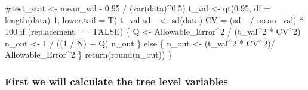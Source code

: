 \documentclass[
  letterpaper,
]{book}
\newenvironment{Shaded}{\begin{snugshade}}{\end{snugshade}}
\newcommand{\AttributeTok}[1]{\textcolor[rgb]{0.40,0.45,0.13}{#1}}
\newcommand{\CommentTok}[1]{\textcolor[rgb]{0.37,0.37,0.37}{#1}}
\newcommand{\ConstantTok}[1]{\textcolor[rgb]{0.56,0.35,0.01}{#1}}
\newcommand{\ControlFlowTok}[1]{\textcolor[rgb]{0.00,0.23,0.31}{#1}}
\newcommand{\DecValTok}[1]{\textcolor[rgb]{0.68,0.00,0.00}{#1}}
\newcommand{\FloatTok}[1]{\textcolor[rgb]{0.68,0.00,0.00}{#1}}
\newcommand{\FunctionTok}[1]{\textcolor[rgb]{0.28,0.35,0.67}{#1}}
\newcommand{\NormalTok}[1]{\textcolor[rgb]{0.00,0.23,0.31}{#1}}
\newcommand{\OtherTok}[1]{\textcolor[rgb]{0.00,0.23,0.31}{#1}}
\newcommand{\SpecialCharTok}[1]{\textcolor[rgb]{0.37,0.37,0.37}{#1}}
\begin{document}
\begin{Shaded}
\begin{Highlighting}[]
  \CommentTok{\#test\_stat \textless{}{-} mean\_val {-} 0.95 / (var(data)\^{}0.5)}
\NormalTok{  t\_val }\OtherTok{\textless{}{-}} \FunctionTok{qt}\NormalTok{(}\FloatTok{0.95}\NormalTok{, }\AttributeTok{df =} \FunctionTok{length}\NormalTok{(data)}\SpecialCharTok{{-}}\DecValTok{1}\NormalTok{, }\AttributeTok{lower.tail =}\NormalTok{ T)}
\NormalTok{  t\_val}
\NormalTok{  sd\_ }\OtherTok{\textless{}{-}} \FunctionTok{sd}\NormalTok{(data)}
\NormalTok{  CV }\OtherTok{=}\NormalTok{ (sd\_ }\SpecialCharTok{/}\NormalTok{ mean\_val) }\SpecialCharTok{*} \DecValTok{100} 
  \ControlFlowTok{if}\NormalTok{ (replacement }\SpecialCharTok{==} \ConstantTok{FALSE}\NormalTok{) \{}
\NormalTok{    Q }\OtherTok{\textless{}{-}}\NormalTok{ Allowable\_Error}\SpecialCharTok{\^{}}\DecValTok{2} \SpecialCharTok{/}\NormalTok{ (t\_val}\SpecialCharTok{\^{}}\DecValTok{2} \SpecialCharTok{*}\NormalTok{ CV}\SpecialCharTok{\^{}}\DecValTok{2}\NormalTok{)}
\NormalTok{    n\_out }\OtherTok{\textless{}{-}} \DecValTok{1} \SpecialCharTok{/}\NormalTok{ ((}\DecValTok{1} \SpecialCharTok{/}\NormalTok{ N) }\SpecialCharTok{+}\NormalTok{ Q)}
\NormalTok{    n\_out}
\NormalTok{    \} }\ControlFlowTok{else}\NormalTok{ \{}
\NormalTok{    n\_out }\OtherTok{\textless{}{-}}\NormalTok{ (t\_val}\SpecialCharTok{\^{}}\DecValTok{2} \SpecialCharTok{*}\NormalTok{ CV}\SpecialCharTok{\^{}}\DecValTok{2}\NormalTok{)}\SpecialCharTok{/}\NormalTok{ Allowable\_Error}\SpecialCharTok{\^{}}\DecValTok{2}
\NormalTok{  \}}
  \FunctionTok{return}\NormalTok{(}\FunctionTok{round}\NormalTok{(n\_out))}
\NormalTok{\}}
\end{Highlighting}
\end{Shaded}

\hypertarget{first-we-will-calculate-the-tree-level-variables}{%
\subsubsection{First we will calculate the tree level
variables}\label{first-we-will-calculate-the-tree-level-variables}}
\end{document}
